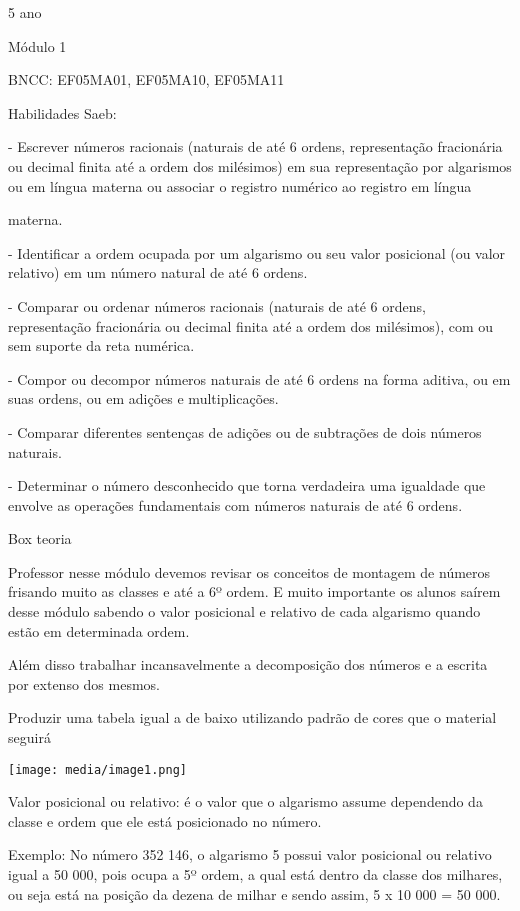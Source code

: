 5 ano

Módulo 1

BNCC: EF05MA01, EF05MA10, EF05MA11

Habilidades Saeb:

- Escrever números racionais (naturais de até 6 ordens, representação
fracionária ou decimal finita até a ordem dos milésimos) em sua
representação por algarismos ou em língua materna ou associar o registro
numérico ao registro em língua

materna.

- Identificar a ordem ocupada por um algarismo ou seu valor posicional
(ou valor relativo) em um número natural de até 6 ordens.

- Comparar ou ordenar números racionais (naturais de até 6 ordens,
representação fracionária ou decimal finita até a ordem dos milésimos),
com ou sem suporte da reta numérica.

- Compor ou decompor números naturais de até 6 ordens na forma aditiva,
ou em suas ordens, ou em adições e multiplicações.

- Comparar diferentes sentenças de adições ou de subtrações de dois
números naturais.

- Determinar o número desconhecido que torna verdadeira uma igualdade
que envolve as operações fundamentais com números naturais de até 6
ordens.

Box teoria

Professor nesse módulo devemos revisar os conceitos de montagem de
números frisando muito as classes e até a 6º ordem. E muito importante
os alunos saírem desse módulo sabendo o valor posicional e relativo de
cada algarismo quando estão em determinada ordem.

Além disso trabalhar incansavelmente a decomposição dos números e a
escrita por extenso dos mesmos.

Produzir uma tabela igual a de baixo utilizando padrão de cores que o
material seguirá

\texttt{[image: media/image1.png]}

Valor posicional ou relativo: é o valor que o algarismo assume
dependendo da classe e ordem que ele está posicionado no número.

Exemplo: No número 352 146, o algarismo 5 possui valor posicional ou
relativo igual a 50 000, pois ocupa a 5º ordem, a qual está dentro da
classe dos milhares, ou seja está na posição da dezena de milhar e sendo
assim, 5 x 10 000 = 50 000.


